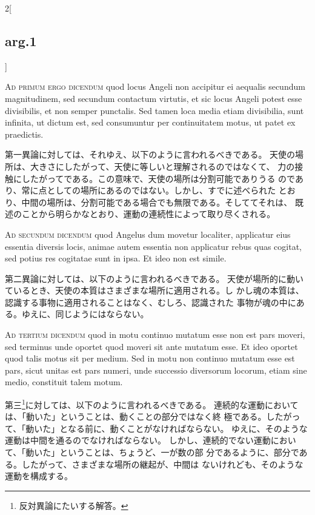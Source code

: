 \documentclass[paper=a4paper,fontsize=10pt,jafontsize=9pt,titlepage]{jlreq}
\begin{document}
\begin{paracol}{2}[\subsection{arg.1}]
\switchcolumn*[\subsection{ad.1}]

{\scshape Ad primum ergo dicendum} quod locus Angeli non
accipitur ei aequalis secundum magnitudinem, sed secundum contactum
virtutis, et sic locus Angeli potest esse divisibilis, et non semper
punctalis. Sed tamen loca media etiam divisibilia, sunt infinita, ut
dictum est, sed consumuntur per continuitatem motus, ut patet ex
praedictis.

\switchcolumn

第一異論に対しては、それゆえ、以下のように言われるべきである。
天使の場所は、大きさにしたがって、天使に等しいと理解されるのではなくて、
 力の接触にしたがってである。この意味で、天使の場所は分割可能でありうる
 のであり、常に点としての場所にあるのではない。しかし、すでに述べられた
 とおり、中間の場所は、分割可能である場合でも無限である。そしててそれは、
 既述のことから明らかなとおり、運動の連続性によって取り尽くされる。

\switchcolumn*[\subsection{ad.2}]

{\scshape Ad secundum dicendum} quod Angelus dum movetur
localiter, applicatur eius essentia diversis locis, animae autem
essentia non applicatur rebus quas cogitat, sed potius res cogitatae
sunt in ipsa. Et ideo non est simile.

\switchcolumn

第二異論に対しては、以下のように言われるべきである。
天使が場所的に動いているとき、天使の本質はさまざまな場所に適用される。し
 かし魂の本質は、認識する事物に適用されることはなく、むしろ、認識された
 事物が魂の中にある。ゆえに、同じようにはならない。

\switchcolumn*[\subsection{ad.3}]

{\scshape Ad tertium dicendum} quod in motu continuo
mutatum esse non est pars moveri, sed terminus unde oportet quod moveri
sit ante mutatum esse. Et ideo oportet quod talis motus sit per
medium. Sed in motu non continuo mutatum esse est pars, sicut unitas est
pars numeri, unde successio diversorum locorum, etiam sine medio,
constituit talem motum.

\switchcolumn

第三\footnote{反対異論にたいする解答。}に対しては、以下のように言われるべきである。
連続的な運動においては、「動いた」ということは、動くことの部分ではなく終
 極である。したがって、「動いた」となる前に、動くことがなければならない。
ゆえに、そのような運動は中間を通るのでなければならない。
しかし、連続的でない運動において、「動いた」ということは、ちょうど、一が数の部
 分であるように、部分である。したがって、さまざまな場所の継起が、中間は
 ないけれども、そのような運動を構成する。

\end{paracol}
\end{document}
